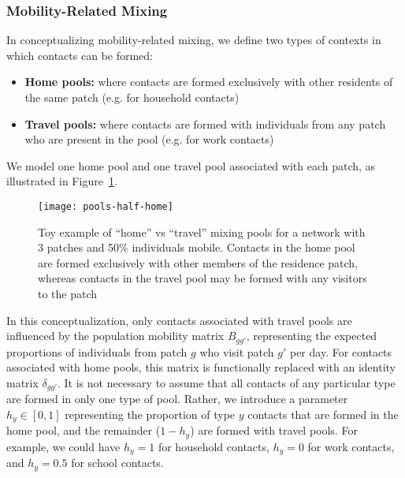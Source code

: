 \subsubsection{Mobility-Related Mixing}\label{meth.prop.mix.mob}
In conceptualizing mobility-related mixing,
we define two types of contexts in which contacts can be formed:
\begin{itemize}
  \item \textbf{Home pools:} where contacts are formed exclusively with
  other residents of the same patch (e.g. for household contacts)
  \item \textbf{Travel pools:} where contacts are formed with
  individuals from any patch who are present in the pool (e.g. for work contacts)
\end{itemize}
We model one home pool and one travel pool associated with each patch,
as illustrated in Figure~\ref{fig:pools}.
\begin{figure}
  \centering
  \texttt{[image: pools-half-home]}
  \caption{Toy example of ``home'' vs ``travel'' mixing pools
    for a network with 3 patches and 50\% individuals mobile.
    Contacts in the home pool are formed exclusively with other members of the residence patch,
    whereas contacts in the travel pool may be formed with any visitors to the patch}
  \label{fig:pools}
\end{figure}
\par
In this conceptualization, only contacts associated with travel pools are influenced by
the population mobility matrix $B_{gg'}$,
representing the expected proportions of individuals from patch $g$ who visit patch $g'$ per day.
For contacts associated with home pools, this matrix is functionally replaced with
an identity matrix $\delta_{gg'}$.
It is not necessary to assume that
all contacts of any particular type are formed in only one type of pool.
Rather, we introduce a parameter $h_y \in [0,1]$ representing
the proportion of type $y$ contacts that are formed in the home pool,
and the remainder ($1-h_y$) are formed with travel pools.
For example, we could have
$h_y = 1$ for household contacts, $h_y = 0$ for work contacts, and $h_y = 0.5$ for school contacts.
